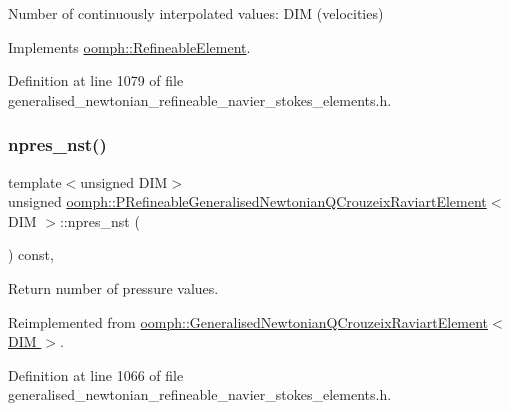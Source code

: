 Number of continuously interpolated values\+: D\+IM (velocities) 



Implements \hyperlink{classoomph_1_1RefineableElement_a53e171a18c9f43f1db90a6876516a073}{oomph\+::\+Refineable\+Element}.



Definition at line 1079 of file generalised\+\_\+newtonian\+\_\+refineable\+\_\+navier\+\_\+stokes\+\_\+elements.\+h.

\mbox{\label{classoomph_1_1PRefineableGeneralisedNewtonianQCrouzeixRaviartElement_a68ed322582ba179cd0845bbd498e11b9}} 
\subsubsection{\texorpdfstring{npres\+\_\+nst()}{npres\_nst()}}
{\footnotesize\ttfamily template$<$unsigned D\+IM$>$ \\
unsigned \hyperlink{classoomph_1_1PRefineableGeneralisedNewtonianQCrouzeixRaviartElement}{oomph\+::\+P\+Refineable\+Generalised\+Newtonian\+Q\+Crouzeix\+Raviart\+Element}$<$ D\+IM $>$\+::npres\+\_\+nst (\begin{DoxyParamCaption}{ }\end{DoxyParamCaption}) const\hspace{0.3cm}{\ttfamily [inline]}, {\ttfamily [virtual]}}



Return number of pressure values. 



Reimplemented from \hyperlink{classoomph_1_1GeneralisedNewtonianQCrouzeixRaviartElement_afdd70f9e267fd6acfb87c9a842c7812c}{oomph\+::\+Generalised\+Newtonian\+Q\+Crouzeix\+Raviart\+Element$<$ D\+I\+M $>$}.



Definition at line 1066 of file generalised\+\_\+newtonian\+\_\+refineable\+\_\+navier\+\_\+stokes\+\_\+elements.\+h.

\mbox{\label{classoomph_1_1PRefineableGeneralisedNewtonianQCrouzeixRaviartElement_a0031a3c03dd28974a552fdc9de0ff6c5}} 
